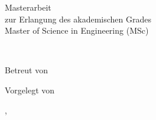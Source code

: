 \begin{titlepage}

\begin{center}

\vspace*{30mm}

{\LARGE\bfseries\mytitle}

\vspace{5mm}

{\bfseries\myworktitle}

\end{center}

\vfill

\begin{flushright}

\vspace*{15mm}

Masterarbeit\\
zur Erlangung des akademischen Grades\\
\vspace*{2mm}
Master of Science in Engineering (MSc)

\vspace{20mm}

\myuniversity\\
\mydepartment

\vspace*{10mm}

Betreut von\\
\mysupervisor

\vspace*{10mm}

Vorgelegt von\\
\myauthor

\vfill

\mysubmissiontown, \mysubmissionyear

\end{flushright}

\end{titlepage}